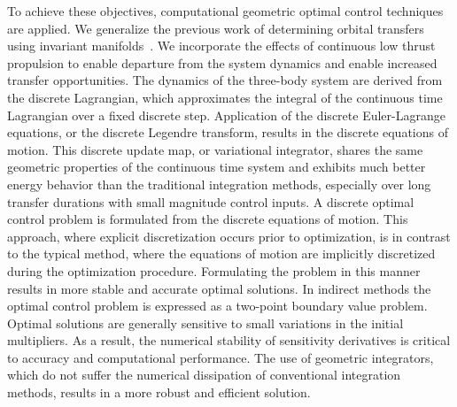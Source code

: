 \documentclass[preprint]{elsarticle}
\begin{document}
To achieve these objectives, computational geometric optimal control techniques are applied. 
We generalize the previous work of determining orbital transfers using invariant manifolds~\cite{koon2011}.
We incorporate the effects of continuous low thrust propulsion to enable departure from the system dynamics and enable increased transfer opportunities.
The dynamics of the three-body system are derived from the discrete Lagrangian, which approximates the integral of the continuous time Lagrangian over a fixed discrete step.
Application of the discrete Euler-Lagrange equations, or the discrete Legendre transform, results in the discrete equations of motion.
This discrete update map, or variational integrator, shares the same geometric properties of the continuous time system and exhibits much better energy behavior than the traditional integration methods, especially over long transfer durations with small magnitude control inputs.
A discrete optimal control problem is formulated from the discrete equations of motion.
This approach, where explicit discretization occurs prior to optimization,  is in contrast to the typical method, where the equations of motion are implicitly discretized during the optimization procedure.
Formulating the problem in this manner results in more stable and accurate optimal solutions. 
In indirect methods the optimal control problem is expressed as a two-point boundary value problem.
Optimal solutions are generally sensitive to small variations in the initial multipliers.
As a result, the numerical stability of sensitivity derivatives is critical to accuracy and computational performance. 
The use of geometric integrators, which do not suffer the numerical dissipation of conventional integration methods, results in a more robust and efficient solution.
\end{document}
